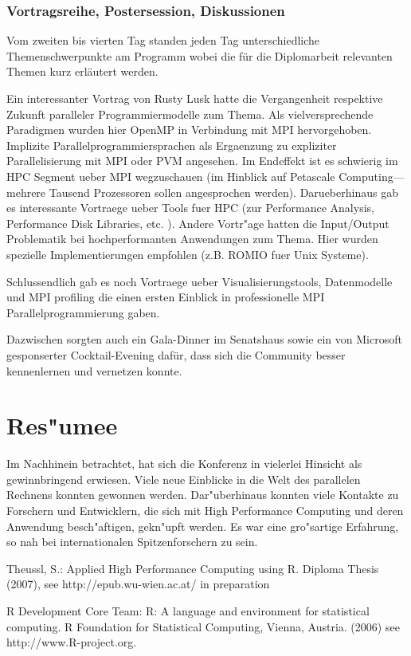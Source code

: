 \documentclass[a4paper,fleqn]{article}
\begin{document}
\subsubsection{Vortragsreihe, Postersession, Diskussionen}
Vom zweiten bis vierten Tag standen jeden Tag unterschiedliche
Themenschwerpunkte am Programm wobei die für die Diplomarbeit
relevanten Themen kurz erläutert werden.

Ein interessanter Vortrag von Rusty Lusk hatte die Vergangenheit
respektive Zukunft paralleler Programmiermodelle zum Thema. Als
vielversprechende Paradigmen wurden hier OpenMP in Verbindung mit MPI
hervorgehoben. Implizite Parallelprogrammiersprachen als Ergaenzung zu
expliziter Parallelisierung mit MPI oder PVM angesehen. Im Endeffekt
ist es schwierig im HPC Segment ueber MPI wegzuschauen (im Hinblick
auf Petascale Computing---mehrere Tausend Prozessoren sollen
angesprochen werden). Darueberhinaus gab es interessante Vortraege
ueber Tools fuer HPC (zur Performance Analysis, Performance Disk
Libraries, etc. ). Andere Vortr"age hatten die Input/Output
Problematik bei hochperformanten Anwendungen zum Thema. Hier wurden
spezielle Implementierungen empfohlen (z.B. ROMIO fuer Unix Systeme). 

Schlussendlich gab es noch Vortraege ueber Visualisierungstools,
Datenmodelle und MPI profiling die einen ersten Einblick in
professionelle MPI Parallelprogrammierung gaben.

Dazwischen sorgten auch ein Gala-Dinner im Senatshaus sowie ein von
Microsoft gesponserter Cocktail-Evening dafür, dass sich die Community
besser kennenlernen und vernetzen konnte.

\section{Res"umee}

Im Nachhinein betrachtet, hat sich die Konferenz in vielerlei Hinsicht
als gewinnbringend erwiesen. Viele neue Einblicke in die Welt des
parallelen Rechnens konnten gewonnen werden. Dar"uberhinaus konnten
viele Kontakte zu Forschern und Entwicklern, die sich mit High
Performance Computing und deren Anwendung besch"aftigen, gekn"upft
werden. Es war eine gro"sartige Erfahrung, so nah bei internationalen
Spitzenforschern zu sein.


\begin{thebibliography}{2}
%
Theussl, S.:
Applied High Performance Computing using R.
Diploma Thesis (2007), see http://epub.wu-wien.ac.at/ in preparation

R Development Core Team:
R: A language and environment for statistical computing. R Foundation
for Statistical Computing, Vienna, Austria. (2006)
see http://www.R-project.org.

\end{thebibliography}
\end{document}
